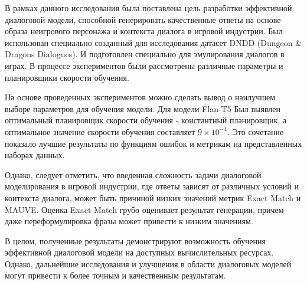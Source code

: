 В рамках данного исследования была поставлена цель разработки эффективной диалоговой модели, способной генерировать качественные ответы на основе образа неигрового персонажа и контекста диалога в игровой индустрии. Был использован специально созданный для исследования датасет DNDD (Dungeon \& Dragons Dialogues). И подготовлен специально для эмулирования диалогов в играх. В процессе экспериментов были рассмотрены различные параметры и планировщики скорости обучения.

На основе проведенных экспериментов можно сделать вывод о наилучшем выборе параметров для обучения модели. Для модели Flan-T5 Был выявлен оптимальный планировщик скорости обучения - константный планировщик, а оптимальное значение скорости обучения составляет $9 \times 10^{-4}$. Это сочетание показало лучшие результаты по функциям ошибок и метрикам на представленных наборах данных.

Однако, следует отметить, что введенная сложность задачи диалоговой моделирования в игровой индустрии, где ответы зависят от различных условий и контекста диалога, может быть причиной низких значений метрик Exact Match и MAUVE. Оценка Exact Match грубо оценивает результат генерации, причем даже переформулировка фразы может привести к низким значениям.

В целом, полученные результаты демонстрируют возможность обучения эффективной диалоговой модели на доступных вычислительных ресурсах. Однако, дальнейшие исследования и улучшения в области диалоговых моделей могут привести к более точным и качественным результатам.